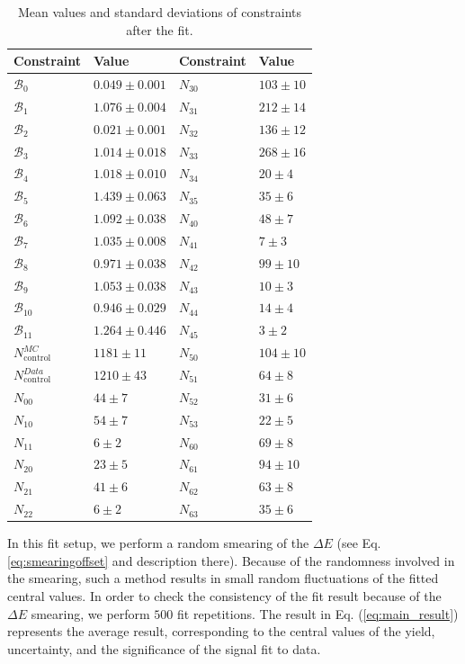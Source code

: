 \begin{table}[H]
	\centering
	\begin{tabular}{l|l||l|l}
		Constraint & Value & Constraint & Value \\
		\toprule
	$\mathcal{B}_{0}$ & $0.049 \pm 0.001$ & $N_{30}$ & $103 \pm 10$\\
	$\mathcal{B}_{1}$ & $1.076 \pm 0.004$ & $N_{31}$ & $212 \pm 14$\\
	$\mathcal{B}_{2}$ & $0.021 \pm 0.001$ & $N_{32}$ & $136 \pm 12$\\
	$\mathcal{B}_{3}$ & $1.014 \pm 0.018$ & $N_{33}$ & $268 \pm 16$\\
	$\mathcal{B}_{4}$ & $1.018 \pm 0.010$ & $N_{34}$ & $20 \pm 4$\\
	$\mathcal{B}_{5}$ & $1.439 \pm 0.063$ & $N_{35}$ & $35 \pm 6$\\
	$\mathcal{B}_{6}$ & $1.092 \pm 0.038$ & $N_{40}$ & $48 \pm 7$\\
	$\mathcal{B}_{7}$ & $1.035 \pm 0.008$ & $N_{41}$ & $7 \pm 3$\\
	$\mathcal{B}_{8}$ & $0.971 \pm 0.038$ & $N_{42}$ & $99 \pm 10$\\
	$\mathcal{B}_{9}$ & $1.053 \pm 0.038$ & $N_{43}$ & $10 \pm 3$\\
	$\mathcal{B}_{10}$ & $0.946 \pm 0.029$ & $N_{44}$ & $14 \pm 4$\\
	$\mathcal{B}_{11}$ & $1.264 \pm 0.446$ & $N_{45}$ & $3 \pm 2$\\
	$N_{\mathrm{control}}^{MC}$ & $1181 \pm 11$ & $N_{50}$ & $104 \pm 10$\\
	$N_{\mathrm{control}}^{Data}$ & $1210 \pm 43$ & $N_{51}$ & $64 \pm 8$\\
	$N_{00}$ & $44 \pm 7$ & $N_{52}$ & $31 \pm 6$\\
	$N_{10}$ & $54 \pm 7$ & $N_{53}$ & $22 \pm 5$\\
	$N_{11}$ & $6 \pm 2$ & $N_{60}$ & $69 \pm 8$\\
	$N_{20}$ & $23 \pm 5$ & $N_{61}$ & $94 \pm 10$\\
	$N_{21}$ & $41 \pm 6$ & $N_{62}$ & $63 \pm 8$\\
	$N_{22}$ & $6 \pm 2$ & $N_{63}$ & $35 \pm 6$\\
		\bottomrule
	\end{tabular}
	\captionsetup{width=.8\linewidth}
	\caption{Mean values and standard deviations of constraints after the fit.}
	\label{tab:constraints}
\end{table}

In this fit setup, we perform a random smearing of the $\Delta E$ (see Eq. \ref{eq:smearingoffset} and description there). Because of the randomness involved in the smearing, such a method results in small random fluctuations of the fitted central values. In order to check the consistency of the fit result because of the $\Delta E$ smearing, we perform $500$ fit repetitions. The result in Eq. (\ref{eq:main_result}) represents the average result, corresponding to the central values of the yield, uncertainty, and the significance of the signal fit to data.

